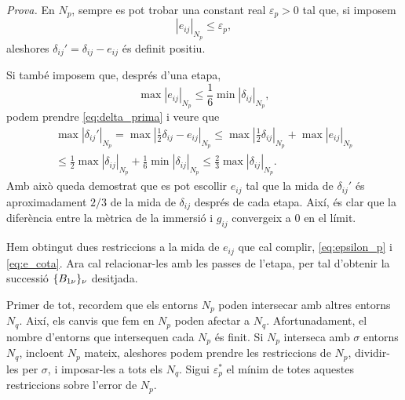 {\color{green!50!black} \textit{Prova.} 
En $N_p$, sempre es pot trobar una constant real $\varepsilon_p>0$ tal que, si imposem 
\begin{equation}\label{eq:epsilon_p}
    |e_{ij}|_{N_p} \le \varepsilon_p,
\end{equation}
aleshores $\delta_{ij}'= \delta_{ij} - e_{ij}$ és definit positiu.

Si també imposem que, després d'una etapa,
\begin{equation}\label{eq:e_cota}
    \max|e_{ij}|_{N_p} \le \frac16\min|\delta_{ij}|_{N_p},
\end{equation}
podem prendre \ref{eq:delta_prima} i veure que
\begin{align}\label{eq:delta_prima_cota}
    \nonumber\max|\delta_{ij}'|_{N_p} = \max\left|\frac12\delta_{ij} - e_{ij}\right|_{N_p} \le \max\left|\frac12\delta_{ij}\right|_{N_p} + \max|e_{ij}|_{N_p} \\
    \le \frac12\max|\delta_{ij}|_{N_p} + \frac16\min|\delta_{ij}|_{N_p} \le \frac23\max|\delta_{ij}|_{N_p}.
\end{align}
Amb això queda demostrat que es pot escollir $e_{ij}$ tal que la mida de $\delta_{ij}'$ és aproximadament $2/3$ de la mida de $\delta_{ij}$ després de cada etapa. Així, és clar que la diferència entre la mètrica de la immersió i $g_{ij}$ convergeix a $0$ en el límit.

Hem obtingut dues restriccions a la mida de $e_{ij}$ que cal complir, \ref{eq:epsilon_p} i \ref{eq:e_cota}. Ara cal relacionar-les amb les passes de l'etapa, per tal d'obtenir la successió $\{B_{1\nu}\}_{\nu}$ desitjada. 

Primer de tot, recordem que els entorns $N_p$ poden intersecar amb altres entorns $N_q$. Així, els canvis que fem en $N_p$ poden afectar a $N_q$. Afortunadament, el nombre d'entorns que intersequen cada $N_p$ és finit. Si $N_p$ interseca amb $\sigma$ entorns $N_q$, incloent $N_p$ mateix, aleshores podem prendre les restriccions de $N_p$, dividir-les per $\sigma$, i imposar-les a tots els $N_q$. Sigui $\varepsilon_p^*$ el mínim de totes aquestes restriccions sobre l'error de $N_p$.

}
